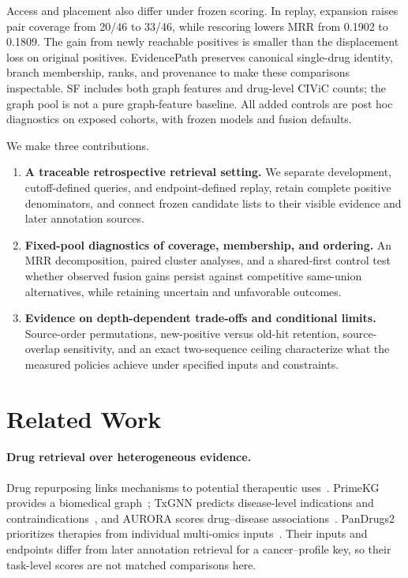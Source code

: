 Access and placement also differ under frozen scoring. In replay, expansion raises pair coverage from 20/46 to 33/46, while rescoring lowers MRR from 0.1902 to 0.1809. The gain from newly reachable positives is smaller than the displacement loss on original positives. EvidencePath preserves canonical single-drug identity, branch membership, ranks, and provenance to make these comparisons inspectable. SF includes both graph features and drug-level CIViC counts; the graph pool is not a pure graph-feature baseline. All added controls are post hoc diagnostics on exposed cohorts, with frozen models and fusion defaults.

We make three contributions.
\begin{enumerate}
\item \textbf{A traceable retrospective retrieval setting.} We separate development, cutoff-defined queries, and endpoint-defined replay, retain complete positive denominators, and connect frozen candidate lists to their visible evidence and later annotation sources.
\item \textbf{Fixed-pool diagnostics of coverage, membership, and ordering.} An MRR decomposition, paired cluster analyses, and a shared-first control test whether observed fusion gains persist against competitive same-union alternatives, while retaining uncertain and unfavorable outcomes.
\item \textbf{Evidence on depth-dependent trade-offs and conditional limits.} Source-order permutations, new-positive versus old-hit retention, source-overlap sensitivity, and an exact two-sequence ceiling characterize what the measured policies achieve under specified inputs and constraints.
\end{enumerate}

\section{Related Work}
\label{sec:related}
\paragraph{Drug retrieval over heterogeneous evidence.}
Drug repurposing links mechanisms to potential therapeutic uses~\cite{pushpakom}. PrimeKG provides a biomedical graph~\cite{primekg}; TxGNN predicts disease-level indications and contraindications~\cite{txgnn}, and AURORA scores drug--disease associations~\cite{aurora}. PanDrugs2 prioritizes therapies from individual multi-omics inputs~\cite{pandrugs2}. Their inputs and endpoints differ from later annotation retrieval for a cancer--profile key, so their task-level scores are not matched comparisons here.

